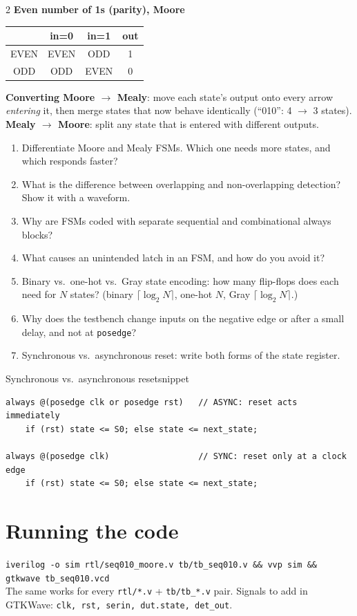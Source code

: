 \documentclass[10pt,a4paper]{article}
\begin{document}
\begin{multicols}{2}
\medskip
\textbf{Even number of 1s (parity), Moore}\\
\begin{tabular}{c c c c}\toprule
 & in=0 & in=1 & out\\\midrule
EVEN & EVEN & ODD & 1\\
ODD & ODD & EVEN & 0\\\bottomrule
\end{tabular}

\medskip
\textbf{Converting Moore $\to$ Mealy}: move each state's output onto every arrow
\emph{entering} it, then merge states that now behave identically (``010'': 4 $\to$ 3 states).\\[2pt]
\textbf{Mealy $\to$ Moore}: split any state that is entered with different outputs.
\end{multicols}

\begin{tip}
\begin{enumerate}[leftmargin=*,itemsep=0pt]
\item Differentiate Moore and Mealy FSMs. Which one needs more states, and which responds faster?
\item What is the difference between overlapping and non-overlapping detection? Show it with a waveform.
\item Why are FSMs coded with separate sequential and combinational always blocks?
\item What causes an unintended latch in an FSM, and how do you avoid it?
\item Binary vs.\ one-hot vs.\ Gray state encoding: how many flip-flops does each need for $N$ states?
  (binary $\lceil\log_2 N\rceil$, one-hot $N$, Gray $\lceil\log_2 N\rceil$.)
\item Why does the testbench change inputs on the negative edge or after a small delay, and not at
  \texttt{posedge}?
\item Synchronous vs.\ asynchronous reset: write both forms of the state register.
\end{enumerate}
\end{tip}

\begin{codeslice}{Synchronous vs.\ asynchronous reset}{snippet}
\begin{lstlisting}
always @(posedge clk or posedge rst)   // ASYNC: reset acts immediately
    if (rst) state <= S0; else state <= next_state;

always @(posedge clk)                  // SYNC: reset only at a clock edge
    if (rst) state <= S0; else state <= next_state;
\end{lstlisting}
\end{codeslice}

\section*{Running the code}
{\small
\texttt{iverilog -o sim rtl/seq010\_moore.v tb/tb\_seq010.v \&\& vvp sim \&\& gtkwave tb\_seq010.vcd}\\
The same works for every \texttt{rtl/*.v} + \texttt{tb/tb\_*.v} pair. Signals to add in GTKWave:
\texttt{clk, rst, serin, dut.state, det\_out}.}
\end{document}
